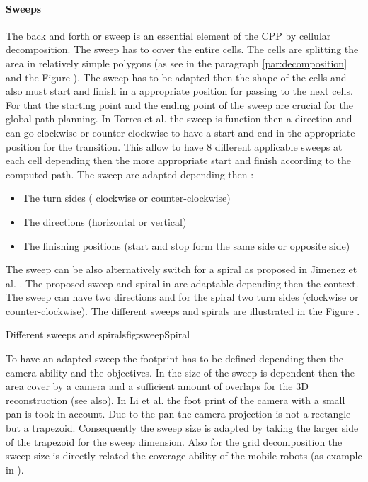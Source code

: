  \paragraph*{Sweeps} \label{par:sweep}
	The back and forth or sweep is an essential element of the CPP by cellular decomposition. The sweep has to cover the entire cells. The cells are splitting the area in relatively simple polygons (as see in the paragraph \ref{par:decomposition} and  the Figure ). The sweep has to be adapted then the shape of the cells and also must start and finish in a appropriate position for passing to the next cells.
	For that the starting point and the ending point of the sweep are crucial for the global path planning.
	In Torres et al. \cite{144*torres2016}  the sweep is function then a direction and can go clockwise or counter-clockwise to have a start and end in the appropriate position for the transition. 
	 This allow to have 8 different applicable sweeps at each cell depending then the more appropriate start and finish  according to the computed path. The sweep are adapted depending then : 
	 \begin{itemize}
	 \item The turn sides ( clockwise or counter-clockwise)
	 \item The directions (horizontal or vertical)
	 \item The finishing  positions (start and stop form the same side or opposite side)
\end{itemize}	
	 The sweep can be also alternatively switch for a spiral as proposed in Jimenez et al. \citep{217*jimenez2007}. The proposed sweep and spiral in  \citep{217*jimenez2007}  are adaptable depending then the context. The sweep can have two directions and for the spiral two turn sides (clockwise or counter-clockwise).  The different sweeps and spirals are illustrated in the Figure . 
	  \begin{mfigures}[!]{Different sweeps and spirals}{fig:sweepSpiral} \centering
{}
\end{mfigures} 

	To have an adapted sweep the footprint has to be defined depending then the camera ability and the objectives. In \cite{144*torres2016} the size of the sweep is dependent then the area cover by a camera and a sufficient amount of overlaps for the 3D reconstruction (see also\citep{191*di2016}). In Li et al.  \citep{146*li2011} the foot print of the camera with a small pan is took in account. Due to the pan the camera projection is not a rectangle but a trapezoid. Consequently the sweep size is adapted by taking the larger side of the trapezoid for the sweep dimension.
	Also for the grid decomposition the sweep size is directly related the coverage ability of the mobile robots (as example in \citep{215*lee2010,195*choi2009}).  %
	
